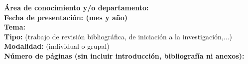 \documentclass[a4paper, 12pt, oneside]{book}
\begin{document}
\begin{titlepage}
{\bf Área de conocimiento y/o departamento:} \\

{\bf Fecha de presentación: (mes y año)} \\

{\bf Tema:} \\

{\bf Tipo:} {(trabajo de revisión bibliográfica, de iniciación a la investigación,...)} \\

{\bf Modalidad:} {(individual o grupal)} \\

{\bf Número de páginas (sin incluir introducción, bibliografía ni anexos):} \\

\end{titlepage}


\newpage
\mbox{}
\thispagestyle{empty}


\end{document}
